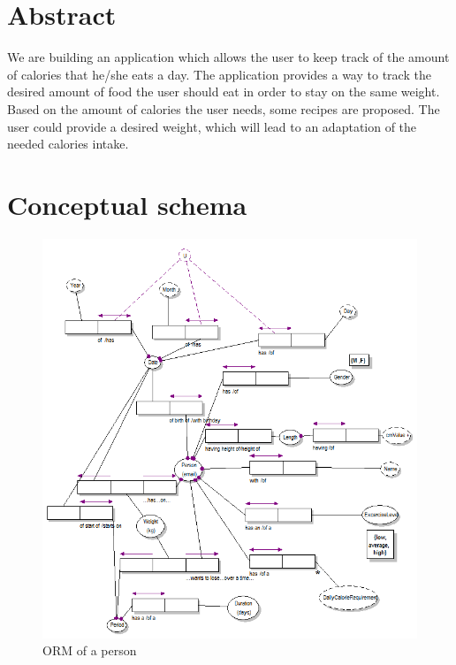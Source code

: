 



\maketitlepage




\section{Abstract}
We are building an application which allows the user to keep track of the amount of calories that he/she eats a day.  The application provides a way to track the desired amount of food the user should eat in order to stay on the same weight. Based on the amount of calories the user needs, some recipes are proposed. The user could provide a desired weight, which will lead to an adaptation of the needed calories intake.

\newpage

\section{Conceptual schema}



  \begin{figure} [h!]
     \includegraphics[width = 1.3\textwidth]{image/Person} 
     \caption{ORM of a person}
     \label{fig:twotier}
  \end{figure}



